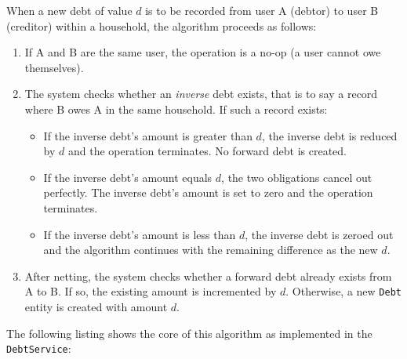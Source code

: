 When a new debt of value $d$ is to be recorded from user A (debtor) to user B (creditor) within a household, the algorithm proceeds as follows:
\begin{enumerate}
    \item If A and B are the same user, the operation is a no-op (a user cannot owe themselves).
    \item The system checks whether an \emph{inverse} debt exists, that is to say a record where B owes A in the same household. If such a record exists:
    \begin{itemize}
        \item If the inverse debt's amount is greater than $d$, the inverse debt is reduced by $d$ and the operation terminates. No forward debt is created.
        \item If the inverse debt's amount equals $d$, the two obligations cancel out perfectly. The inverse debt's amount is set to zero and the operation terminates.
        \item If the inverse debt's amount is less than $d$, the inverse debt is zeroed out and the algorithm continues with the remaining difference as the new $d$.
    \end{itemize}
    \item After netting, the system checks whether a forward debt already exists from A to B. If so, the existing amount is incremented by $d$. Otherwise, a new \texttt{Debt} entity is created with amount $d$.
\end{enumerate}

The following listing shows the core of this algorithm as implemented in the \texttt{DebtService}:

